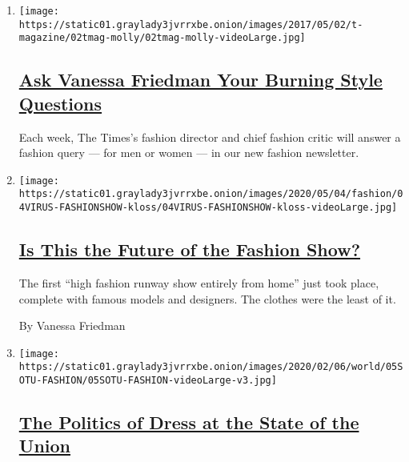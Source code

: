 \begin{enumerate}
\def\labelenumi{\arabic{enumi}.}
\item
  \texttt{[image: https://static01.graylady3jvrrxbe.onion/images/2017/05/02/t-magazine/02tmag-molly/02tmag-molly-videoLarge.jpg]}

  \hypertarget{ask-vanessa-friedman-your-burning-style-questions}{%
  \subsection{\texorpdfstring{\href{/2017/05/03/fashion/style-questions-newsletter-open-thread.html}{Ask
  Vanessa Friedman Your Burning Style
  Questions}}{Ask Vanessa Friedman Your Burning Style Questions}}\label{ask-vanessa-friedman-your-burning-style-questions}}

  Each week, The Times's fashion director and chief fashion critic will
  answer a fashion query --- for men or women --- in our new fashion
  newsletter.
\item
  \texttt{[image: https://static01.graylady3jvrrxbe.onion/images/2020/05/04/fashion/04VIRUS-FASHIONSHOW-kloss/04VIRUS-FASHIONSHOW-kloss-videoLarge.jpg]}

  \hypertarget{is-this-the-future-of-the-fashion-show}{%
  \subsection{\texorpdfstring{\href{/2020/05/02/fashion/coronavirus-digital-fashion-show.html}{Is
  This the Future of the Fashion
  Show?}}{Is This the Future of the Fashion Show?}}\label{is-this-the-future-of-the-fashion-show}}

  The first ``high fashion runway show entirely from home'' just took
  place, complete with famous models and designers. The clothes were the
  least of it.

  By Vanessa Friedman
\item
  \texttt{[image: https://static01.graylady3jvrrxbe.onion/images/2020/02/06/world/05SOTU-FASHION/05SOTU-FASHION-videoLarge-v3.jpg]}

  \hypertarget{the-politics-of-dress-at-the-state-of-the-union}{%
  \subsection{\texorpdfstring{\href{/2020/02/05/style/melanie-trump-congresswomen-in-white-state-of-the-union.html}{The
  Politics of Dress at the State of the
  Union}}{The Politics of Dress at the State of the Union}}\label{the-politics-of-dress-at-the-state-of-the-union}}


\end{enumerate}
